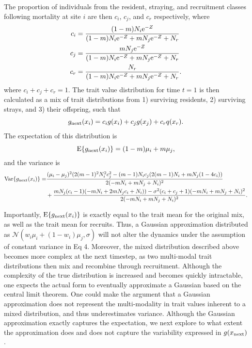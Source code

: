 \documentclass{revtex4}
\begin{document}
The proportion of individuals from the resident, straying, and recruitment classes following mortality at site $i$ are then $c_i$, $c_j$, and $c_r$ respectively, where
\begin{align}
c_i &= \frac{(1-m)N_i{\rm e}^{-Z}}{(1-m)N_i{\rm e}^{-Z} + m N_j{\rm e}^{-Z} + N_r} \\ \nonumber
c_j &= \frac{m N_j{\rm e}^{-Z}}{(1-m)N_i{\rm e}^{-Z} + m N_j{\rm e}^{-Z} + N_r} \\ \nonumber
c_r &= \frac{N_r}{(1-m)N_i{\rm e}^{-Z} + m N_j{\rm e}^{-Z} + N_r}.
\end{align}
where $c_i + c_j + c_r= 1$.
The trait value distribution for time $t=1$ is then calculated as a mix of trait distributions from 1) surviving residents, 2) surviving strays, and 3) their offspring, such that
\begin{equation}
  g_{{\rm next}}(x_i) = c_i g(x_i) + c_j g(x_j) + c_r q(x_r).
\end{equation}
The expectation of this distribution is
\begin{equation}
{\rm E}\{g_{\rm next}(x_i)\}=(1-m)\mu_i + m\mu_j,
\end{equation} and the variance is
\begin{align}
  {\rm Var}\{g_{{\rm next}}(x_i)\}=&\frac{(\mu_i-\mu_j)^2 (2 (m-1)^2 N_i^2 c_j^2-(m-1) N_i c_j (2 (m-1) N_i+m N_j (1-4 c_i))}{2 (-m N_i+m N_j+N_i)^2} \\ \nonumber
  &+ \frac{m N_j (c_i-1) (-m N_i+2 m N_j c_i+N_i))-\sigma ^2 (c_i+c_j+1) (-m N_i+m N_j+N_i)^2}{2 (-m N_i+m N_j+N_i)^2}.
\end{align}

Importantly, ${\rm E}\{g_{{\rm next}}(x_i)\}$ is exactly equal to the trait mean for the original mix, as well as the trait mean for recruits.
Thus, a Gaussian approximation distributed as $\mathcal{N}(w_i\mu_i + (1-w_i)\mu_j,\sigma)$ will not alter the dynamics under the assumption of constant variance in Eq 4.
Moreover, the mixed distribution described above becomes more complex at the next timestep, as two multi-modal trait distributions then mix and recombine through recruitment.
Although the complexity of the true distribution is increased and becomes quickly intractable, one expects the actual form to eventually approximate a Gaussian based on the central limit theorem.
One could make the argument that a Gaussian approximation does not represent the multi-modality in trait values inherent to a mixed distribution, and thus underestimates variance.
Although the Gaussian approximation exactly captures the expectation, we next explore to what extent the approximation does and does not capture the variability expressed in $g(x_{\rm next})$.
\end{document}

